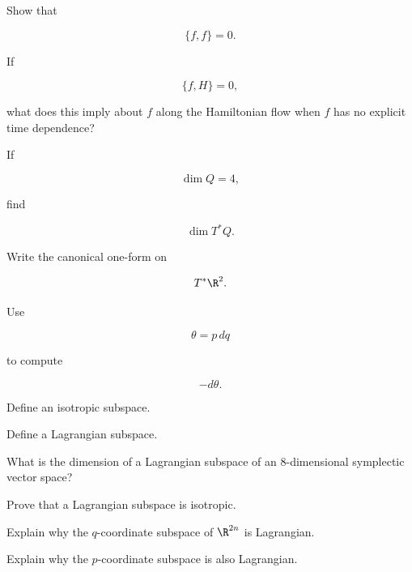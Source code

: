 \begin{exercise}[2]
Show that

\[
\{f,f\}=0.
\]
\end{exercise}

\begin{exercise}[2]
If

\[
\{f,H\}=0,
\]

what does this imply about \(f\) along the Hamiltonian flow when \(f\) has no
explicit time dependence?
\end{exercise}

\begin{exercise}[2]
If

\[
\dim Q=4,
\]

find

\[
\dim T^*Q.
\]
\end{exercise}

\begin{exercise}[2]
Write the canonical one-form on

\[
T^*\R^2.
\]
\end{exercise}

\begin{exercise}[2]
Use

\[
\theta=p\,dq
\]

to compute

\[
-d\theta.
\]
\end{exercise}

\begin{exercise}[2]
Define an isotropic subspace.
\end{exercise}

\begin{exercise}[2]
Define a Lagrangian subspace.
\end{exercise}

\begin{exercise}[2]
What is the dimension of a Lagrangian subspace of an
\(8\)-dimensional symplectic vector space?
\end{exercise}

\begin{exercise}[3]
Prove that a Lagrangian subspace is isotropic.
\end{exercise}

\begin{exercise}[3]
Explain why the \(q\)-coordinate subspace of \(\R^{2n}\) is Lagrangian.
\end{exercise}

\begin{exercise}[3]
Explain why the \(p\)-coordinate subspace is also Lagrangian.
\end{exercise}

